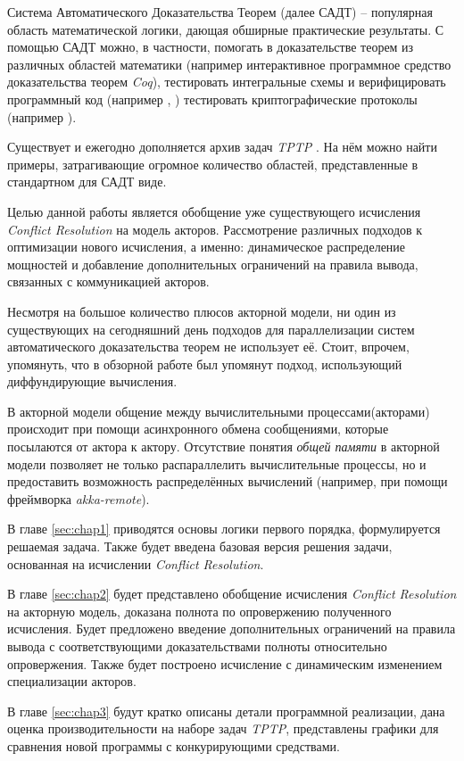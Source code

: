 \startprefacepage

Система Автоматического Доказательства Теорем (далее САДТ) -- популярная область математической логики, дающая обширные практические результаты. С помощью САДТ можно, в частности, помогать в доказательстве теорем из различных областей математики (например интерактивное программное средство доказательства теорем \emph{Coq}), тестировать интегральные схемы и верифицировать программный код (например \cite{Detlefs:2005:STP:1066100.1066102}, \cite{zap-automated-theorem-proving-for-software-analysis}) тестировать криптографические протоколы (например \cite{DBLP:journals/corr/MoranW17}).


Существует и ежегодно дополняется архив задач \emph{TPTP} \cite{Sutcliffe2009}. На нём можно найти примеры, затрагивающие огромное количество областей, представленные в стандартном для САДТ виде.


Целью данной работы является обобщение уже существующего исчисления \emph{Conflict Resolution} \cite{DBLP:journals/corr/SlaneyP16} на модель акторов. Рассмотрение различных подходов к оптимизации нового исчисления, а именно: динамическое распределение мощностей и добавление дополнительных ограничений на правила вывода, связанных с коммуникацией акторов.


Несмотря на большое количество плюсов акторной модели, ни один из существующих на сегодняшний день подходов для параллелизации систем автоматического доказательства теорем не использует её. Стоит, впрочем, упомянуть, что в обзорной работе \cite{Bonacina2018} был упомянут подход, использующий диффундирующие вычисления. 

В акторной модели общение между вычислительными процессами(акторами) происходит при помощи асинхронного обмена сообщениями, которые посылаются от актора к актору. Отсутствие понятия \emph{общей памяти} в акторной модели позволяет не только распараллелить вычислительные процессы, но и предоставить возможность распределённых вычислений (например, при помощи фреймворка \emph{akka-remote}).


В главе \ref{sec:chap1} приводятся основы логики первого порядка, формулируется решаемая задача. Также будет введена базовая версия решения задачи, основанная на исчислении \emph{Conflict Resolution}. 


В главе \ref{sec:chap2} будет представлено обобщение исчисления \emph{Conflict Resolution} на акторную модель, доказана полнота по опровержению полученного исчисления. Будет предложено введение дополнительных ограничений на правила вывода с соответствующими доказательствами полноты относительно опровержения. Также будет построено исчисление с динамическим изменением специализации акторов.

В главе \ref{sec:chap3} будут кратко описаны детали программной реализации, дана оценка производительности на наборе задач \emph{TPTP}, представлены графики для сравнения новой программы с конкурирующими средствами.